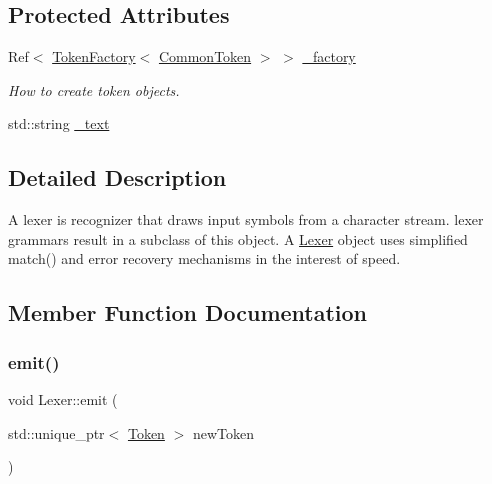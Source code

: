 \subsection*{Protected Attributes}
\begin{DoxyCompactItemize}
\item 
\mbox{\label{classantlr4_1_1Lexer_a45093aed32a3934ccd7524fb02984fbd}} 
Ref$<$ \hyperlink{classantlr4_1_1TokenFactory}{Token\+Factory}$<$ \hyperlink{classantlr4_1_1CommonToken}{Common\+Token} $>$ $>$ \hyperlink{classantlr4_1_1Lexer_a45093aed32a3934ccd7524fb02984fbd}{\+\_\+factory}
\begin{DoxyCompactList}\small\item\em How to create token objects. \end{DoxyCompactList}\item 
std\+::string \hyperlink{classantlr4_1_1Lexer_a3a52d82944ab71f4b5cbeb785fc8471a}{\+\_\+text}
\end{DoxyCompactItemize}


\subsection{Detailed Description}
A lexer is recognizer that draws input symbols from a character stream. lexer grammars result in a subclass of this object. A \hyperlink{classantlr4_1_1Lexer}{Lexer} object uses simplified match() and error recovery mechanisms in the interest of speed. 

\subsection{Member Function Documentation}
\mbox{\label{classantlr4_1_1Lexer_a8372c0ff70d9a70bc941e0322689aece}} 
\subsubsection{\texorpdfstring{emit()}{emit()}\hspace{0.1cm}{\footnotesize\ttfamily [1/2]}}
{\footnotesize\ttfamily void Lexer\+::emit (\begin{DoxyParamCaption}\item[{std\+::unique\+\_\+ptr$<$ \hyperlink{classantlr4_1_1Token}{Token} $>$}]{new\+Token }\end{DoxyParamCaption})\hspace{0.3cm}{\ttfamily [virtual]}}

